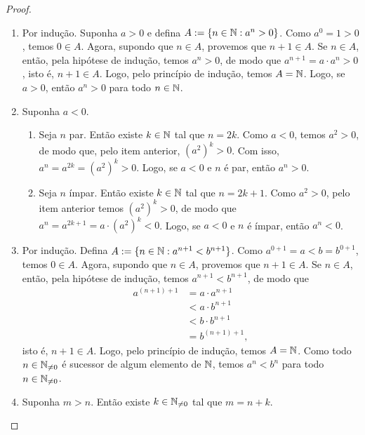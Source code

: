 \begin{proof}
    \leavevmode
        \begin{enumerate}[leftmargin=*, align=left, label=\textbf{(\alph*)}]
            \item Por indução. Suponha $a > 0$ e defina $A := \{n \in \mathbb{N} : a^n > 0\}$. Como $a^0 = 1 > 0$, temos $0 \in A$. Agora, supondo que $n \in A$, provemos que $n+1 \in A$. Se $n \in A$, então, pela hipótese de indução, temos $a^n > 0$, de modo que $a^{n+1} = a \cdot a^n > 0$, isto é, $n+1 \in A$. Logo, pelo princípio de indução, temos $A = \mathbb{N}$. Logo, se $a > 0$, então $a^n > 0$ para todo $n \in \mathbb{N}$. \blackproof
            \item Suponha $a < 0$.
                \begin{enumerate}[label=\roman*.]
                    \item Seja $n$ par. Então existe $k \in \mathbb{N}$ tal que $n = 2k$. Como $a < 0$, temos $a^2 > 0$, de modo que, pelo item anterior, $(a^2)^k > 0$. Com isso, $a^n = a^{2k} = (a^2)^k > 0$. Logo, se $a < 0$ e $n$ é par, então $a^n > 0$.
                    \item Seja $n$ ímpar. Então existe $k \in \mathbb{N}$ tal que $n = 2k+1$. Como $a^2 > 0$, pelo item anterior temos $(a^2)^k > 0$, de modo que $a^n = a^{2k+1} = a \cdot (a^2)^k < 0$. Logo, se $a < 0$ e $n$ é ímpar, então $a^n < 0$.
                \end{enumerate}
            \blackproof
            \item Por indução. Defina $A := \{n \in \mathbb{N} : a^{n+1} < b^{n+1}\}$. Como $a^{0+1} = a < b = b^{0+1}$, temos $0 \in A$. Agora, supondo que $n \in A$, provemos que $n+1 \in A$. Se $n \in A$, então, pela hipótese de indução, temos $a^{n+1} < b^{n+1}$, de modo que
                \begin{align*}
                    a^{(n+1)+1} &= a \cdot a^{n+1} \\
                    &< a \cdot b^{n+1} \\
                    &< b \cdot b^{n+1} \\
                    &= b^{(n+1)+1},
                \end{align*}
            isto é, $n+1 \in A$. Logo, pelo princípio de indução, temos $A = \mathbb{N}$. Como todo $n \in \mathbb{N}_{\neq 0}$ é sucessor de algum elemento de $\mathbb{N}$, temos $a^n < b^n$ para todo $n \in \mathbb{N}_{\neq 0}$. \blackproof
            \item Suponha $m > n$. Então existe $k \in \mathbb{N}_{\neq 0}$ tal que $m = n+k$.
                \begin{enumerate}[label=\roman*.]

\end{enumerate}
\end{enumerate}
\end{proof}
